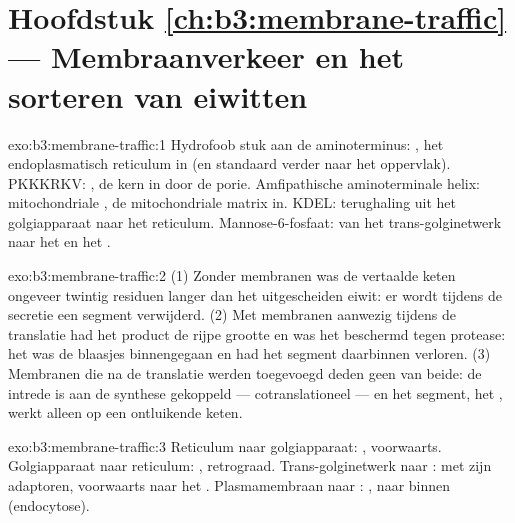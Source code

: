 \section*{Hoofdstuk \ref{ch:b3:membrane-traffic} --- Membraanverkeer en het sorteren van eiwitten}

\begin{solution}{exo:b3:membrane-traffic:1}
Hydrofoob stuk aan de aminoterminus: , het endoplasmatisch
reticulum in (en standaard verder naar het oppervlak). PKKKRKV:
, de kern in door de porie. Amfipathische
aminoterminale helix: mitochondriale , de mitochondriale
matrix in. KDEL: terughaling uit het golgiapparaat naar het reticulum.
Mannose-6-fosfaat: van het trans-golginetwerk naar het  en het
.
\end{solution}

\begin{solution}{exo:b3:membrane-traffic:2}
(1) Zonder membranen was de vertaalde keten ongeveer twintig residuen
langer dan het uitgescheiden eiwit: er wordt tijdens de secretie een
segment verwijderd. (2) Met membranen aanwezig tijdens de translatie had
het product de rijpe grootte en was het beschermd tegen protease: het
was de blaasjes binnengegaan en had het segment daarbinnen verloren.
(3) Membranen die na de translatie werden toegevoegd deden geen van
beide: de intrede is aan de synthese gekoppeld --- cotranslationeel ---
en het segment, het , werkt alleen op een ontluikende
keten.
\end{solution}

\begin{solution}{exo:b3:membrane-traffic:3}
Reticulum naar golgiapparaat: , voorwaarts. Golgiapparaat naar
reticulum: , retrograad. Trans-golginetwerk naar :
 met zijn adaptoren, voorwaarts naar het .
Plasmamembraan naar : , naar binnen (endocytose).
\end{solution}

